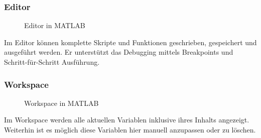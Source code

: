             \subsubsection*{Editor}
                \begin{figure}[H]
                    \centering
                    \caption{Editor in MATLAB}
                \end{figure}
                Im Editor können komplette Skripte und Funktionen geschrieben, gespeichert und ausgeführt werden. Er unterstützt das Debugging mittels Breakpoints und Schritt-für-Schritt Ausführung.
            \subsubsection*{Workspace}
                \begin{figure}[H]
                    \centering
                    \caption{Workspace in MATLAB}
                \end{figure}
                Im Workspace werden alle aktuellen Variablen inklusive ihres Inhalts angezeigt. Weiterhin ist es möglich diese Variablen hier manuell anzupassen oder zu löschen.

